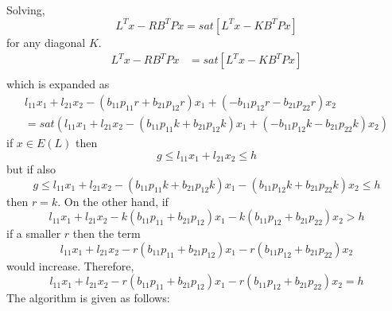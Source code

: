 Solving,
\begin{equation}
    L^Tx-RB^TPx=sat[L^Tx-KB^TPx]
\end{equation}
for any diagonal $K$.
\begin{equation}
\begin{split}
    L^Tx-RB^TPx&=sat[L^Tx-KB^TPx]\\
\end{split}
\end{equation}
which is expanded as
\begin{equation}
    \begin{split}
    l_{11}x_1+l_{21}x_2-(b_{11}p_{11}r+b_{21}p_{12}r)x_1+(-b_{11}p_{12}r-b_{21}p_{22}r)x_2\\
    =sat(l_{11}x_1+l_{21}x_2-(b_{11}p_{11}k+b_{21}p_{12}k)x_1+(-b_{11}p_{12}k-b_{21}p_{22}k)x_2)
    \end{split}
\end{equation}
if $x\in E(L)$ then 
\begin{equation}
    g\leq l_{11}x_1+l_{21}x_2 \leq h
\end{equation}
but if also
\begin{equation}
    g\leq l_{11}x_1+l_{21}x_2-(b_{11}p_{11}k+b_{21}p_{12}k)x_1-(b_{11}p_{12}k+b_{21}p_{22}k)x_2\leq h
\end{equation}
then $r=k$. On the other hand, if
\begin{equation}
    l_{11}x_1+l_{21}x_2-k(b_{11}p_{11}+b_{21}p_{12})x_1-k(b_{11}p_{12}+b_{21}p_{22})x_2> h
\end{equation}
if a smaller $r$ then the term
\begin{equation}
    l_{11}x_1+l_{21}x_2-r(b_{11}p_{11}+b_{21}p_{12})x_1-r(b_{11}p_{12}+b_{21}p_{22})x_2
\end{equation}
would increase. Therefore,
\begin{equation}
    l_{11}x_1+l_{21}x_2-r(b_{11}p_{11}+b_{21}p_{12})x_1-r(b_{11}p_{12}+b_{21}p_{22})x_2=h
\end{equation}
The algorithm is given as follows:
